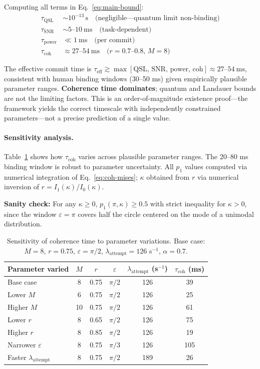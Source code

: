 \documentclass[12pt]{article}
\begin{document}
Computing all terms in Eq.~\ref{eq:main-bound}:
\begin{align}
\tau_{\mathrm{QSL}} &\sim 10^{-13} \,\mathrm{s} \quad \text{(negligible---quantum limit non-binding)} \\
\tau_{\mathrm{SNR}} &\sim 5\text{--}10~\mathrm{ms} \quad \text{(task-dependent)} \\
\tau_{\mathrm{power}} &\ll 1~\mathrm{ms} \quad \text{(per commit)} \\
\tau_{\mathrm{coh}} &\approx 27\text{--}54~\mathrm{ms} \quad \text{($r = 0.7$--$0.8$, $M = 8$)}
\end{align}

The effective commit time is $\tau_{\mathrm{eff}} \gtrsim \max[\text{QSL, SNR, power, coh}] \approx 27$--$54~\mathrm{ms}$, consistent with human binding windows (30--50 ms) given empirically plausible parameter ranges. \textbf{Coherence time dominates}; quantum and Landauer bounds are not the limiting factors. This is an order-of-magnitude existence proof---the framework yields the correct timescale with independently constrained parameters---not a precise prediction of a single value.

\paragraph{Sensitivity analysis.} Table~\ref{tab:sensitivity} shows how $\tau_{\mathrm{coh}}$ varies across plausible parameter ranges. The 20--80 ms binding window is robust to parameter uncertainty. All $p_1$ values computed via numerical integration of Eq.~\ref{eq:coh-mises}; $\kappa$ obtained from $r$ via numerical inversion of $r = I_1(\kappa)/I_0(\kappa)$.

\textbf{Sanity check:} For any $\kappa \geq 0$, $p_1(\pi, \kappa) \geq 0.5$ with strict inequality for $\kappa > 0$, since the window $\varepsilon = \pi$ covers half the circle centered on the mode of a unimodal distribution.

\begin{table}[H]
\centering
\caption{Sensitivity of coherence time to parameter variations. Base case: $M=8$, $r=0.75$, $\varepsilon=\pi/2$, $\lambda_{\mathrm{attempt}} = 126$ s$^{-1}$, $\alpha=0.7$.}
\label{tab:sensitivity}
\begin{tabular}{lccccc}
\toprule
Parameter varied & $M$ & $r$ & $\varepsilon$ & $\lambda_{\mathrm{attempt}}$ (s$^{-1}$) & $\tau_{\mathrm{coh}}$ (ms) \\
\midrule
Base case & 8 & 0.75 & $\pi/2$ & 126 & 39 \\
Lower $M$ & 6 & 0.75 & $\pi/2$ & 126 & 25 \\
Higher $M$ & 10 & 0.75 & $\pi/2$ & 126 & 61 \\
Lower $r$ & 8 & 0.65 & $\pi/2$ & 126 & 75 \\
Higher $r$ & 8 & 0.85 & $\pi/2$ & 126 & 19 \\
Narrower $\varepsilon$ & 8 & 0.75 & $\pi/3$ & 126 & 105 \\
Faster $\lambda_{\mathrm{attempt}}$ & 8 & 0.75 & $\pi/2$ & 189 & 26 \\
\bottomrule
\end{tabular}
\end{table}
\end{document}
